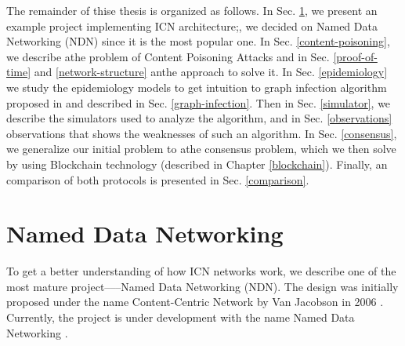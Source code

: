 The remainder of thise thesis is organized as follows.
In Sec. \ref{ndn}, we present an example project implementing ICN architecture;, we decided on Named Data Networking (NDN) since it is the most popular one.
In Sec. \ref{content-poisoning}, we describe athe problem of Content Poisoning Attacks and in Sec. \ref{proof-of-time} and \ref{network-structure} anthe approach to solve it. In Sec. \ref{epidemiology} we study the epidemiology models to get intuition to graph infection algorithm proposed in \cite{konorski2019mitigating} and described in Sec. \ref{graph-infection}. Then in Sec. \ref{simulator}, we describe the simulators used to analyze the algorithm, and in Sec. \ref{observations} observations that shows the weaknesses of such an algorithm. In Sec. \ref{consensus}, we generalize our initial problem to athe consensus problem, which we then solve by using Blockchain technology (described in Chapter \ref{blockchain}). Finally, an comparison of both protocols is presented in Sec. \ref{comparison}.

\section{Named Data Networking}
\label{ndn}
To get a better understanding of how ICN networks work, we describe one of the most mature project–––Named Data Networking (NDN). The design was initially proposed under the name Content-Centric Network by Van Jacobson in 2006 \cite{4ANewWay38:online}. Currently, the project is under development with the name Named Data Networking \cite{NamedDat22:online}. 


